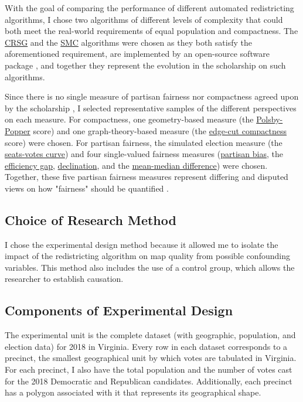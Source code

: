 With the goal of comparing the performance of different automated redistricting algorithms, I chose two algorithms of different levels of complexity that could both meet the real-world requirements of equal population and compactness. The \hyperref[sec:crsg]{CRSG} \parencite{chen2013} and the \hyperref[sec:smc]{SMC} \parencite{mccartan2020} algorithms were chosen as they both satisfy the aforementioned requirement, are implemented by an open-source software package \parencite{fifield2020d}, and together they represent the evolution in the scholarship on such algorithms. 

Since there is no single measure of partisan fairness nor compactness agreed upon by the scholarship \parencite{katz2020}, I selected representative samples of the different perspectives on each measure. For compactness, one geometry-based measure (the \hyperref[sec:polsbypopper]{Polsby-Popper} score) and one graph-theory-based measure (the \hyperref[sec:edgecut]{edge-cut compactness} score) were chosen. For partisan fairness, the simulated election measure (the \hyperref[sec:seatsvotes]{seats-votes curve}) and four single-valued fairness measures (\hyperref[sec:bias]{partisan bias}, the \hyperref[sec:effgap]{efficiency gap}, \hyperref[sec:declination]{declination}, and the \hyperref[sec:meanmed]{mean-median difference}) were chosen. Together, these five partisan fairness measures represent differing and disputed views on how "fairness" should be quantified \parencite{katz2020}. 

\subsection{Choice of Research Method}

I chose the experimental design method because it allowed me to isolate the impact of the redistricting algorithm on map quality from possible confounding variables. This method also includes the use of a control group, which allows the researcher to establish causation. \parencite{peirce2014}

\subsection{Components of Experimental Design}

The experimental unit is the complete dataset (with geographic, population, and election data) for 2018 in Virginia. Every row in each dataset corresponds to a precinct, the smallest geographical unit by which votes are tabulated in Virginia. For each precinct, I also have the total population and the number of votes cast for the 2018 Democratic and Republican candidates. Additionally, each precinct has a polygon associated with it that represents its geographical shape.

